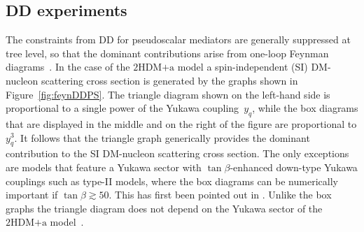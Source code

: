 \documentclass[a4paper, 11pt,notoc]{article}
\newcommand{\hdma}{\ensuremath{\textrm{2HDM+a}}\xspace}
\begin{document}
\subsection{DD experiments}

The constraints from DD for pseudoscalar mediators are generally suppressed at tree level, so that the dominant contributions arise from one-loop Feynman diagrams~\cite{Ipek:2014gua,Arcadi:2017wqi,Sanderson:2018lmj}. In the case of the \hdma model a spin-independent (SI) DM-nucleon  scattering cross section is generated by the graphs shown in Figure~\ref{fig:feynDDPS}. The triangle diagram shown on the left-hand side  is proportional to a single power of the Yukawa coupling~$y_q$, while the box diagrams that are displayed in the middle and on the right of the figure  are proportional to $y_q^3$. It follows that the triangle graph generically provides the dominant contribution to the SI DM-nucleon  scattering cross section. The only exceptions are models that feature a Yukawa sector with  $\tan \beta$-enhanced down-type Yukawa couplings such as type-II models, where the box diagrams can be numerically important if $\tan\beta\gtrsim50$. This has first been pointed out in \cite{Ipek:2014gua}. Unlike the box graphs the triangle diagram does not depend on the Yukawa sector of the \hdma model~\cite{Arcadi:2017wqi,Sanderson:2018lmj}.
\end{document}
